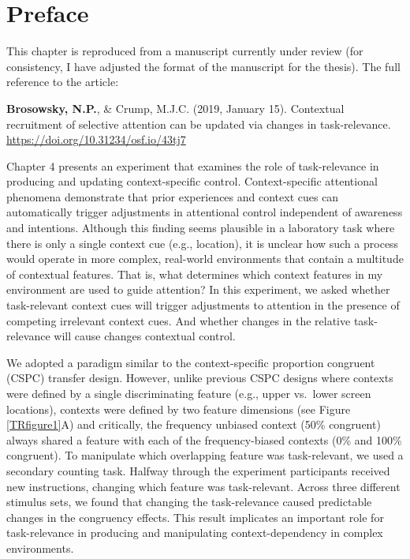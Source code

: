 \documentclass[]{DissertateCUNY}
\begin{document}
\hypertarget{preface-2}{%
\section{Preface}\label{preface-2}}

This chapter is reproduced from a manuscript currently under review (for
consistency, I have adjusted the format of the manuscript for the
thesis). The full reference to the article:

\vspace{1.5em}

\noindent \textbf{Brosowsky, N.P.}, \& Crump, M.J.C. (2019, January 15).
Contextual recruitment of selective attention can be updated via changes
in task-relevance. \url{https://doi.org/10.31234/osf.io/43tj7}
\vspace{1.5em}

Chapter 4 presents an experiment that examines the role of
task-relevance in producing and updating context-specific control.
Context-specific attentional phenomena demonstrate that prior
experiences and context cues can automatically trigger adjustments in
attentional control independent of awareness and intentions. Although
this finding seems plausible in a laboratory task where there is only a
single context cue (e.g., location), it is unclear how such a process
would operate in more complex, real-world environments that contain a
multitude of contextual features. That is, what determines which context
features in my environment are used to guide attention? In this
experiment, we asked whether task-relevant context cues will trigger
adjustments to attention in the presence of competing irrelevant context
cues. And whether changes in the relative task-relevance will cause
changes contextual control.

We adopted a paradigm similar to the context-specific proportion
congruent (CSPC) transfer design. However, unlike previous CSPC designs
where contexts were defined by a single discriminating feature (e.g.,
upper vs.~lower screen locations), contexts were defined by two feature
dimensions (see Figure \ref{TRfigure1}A) and critically, the frequency
unbiased context (50\% congruent) always shared a feature with each of
the frequency-biased contexts (0\% and 100\% congruent). To manipulate
which overlapping feature was task-relevant, we used a secondary
counting task. Halfway through the experiment participants received new
instructions, changing which feature was task-relevant. Across three
different stimulus sets, we found that changing the task-relevance
caused predictable changes in the congruency effects. This result
implicates an important role for task-relevance in producing and
manipulating context-dependency in complex environments.
\end{document}
